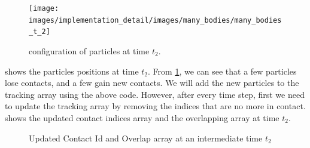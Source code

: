 \begin{figure}[!htpb]
  \centering
  \texttt{[image: images/implementation\_detail/images/many\_bodies/many\_bodies\_t\_2]}
  \caption{configuration of particles at time $t_2$.}
\label{fig:id:15_particle_t_2}
\end{figure}

 shows the particles positions at time $t_2$. From
\cref{fig:id:15_particle_t_2}, we can see that a few particles lose contacts,
and a few gain new contacts. We will add the new particles to the tracking array
using the above code. However, after every time step, first we need to update
the tracking array by removing the indices that are no more in contact.
 shows the updated contact
indices array and the overlapping array at time $t_2$.
\begin{figure}[!htpb]
  \centering
  \caption{Updated Contact Id and Overlap array at an intermediate time $t_2$}
\label{fig:many_bodies_initialize_overlap_1_8_11_t_2}
\end{figure}

